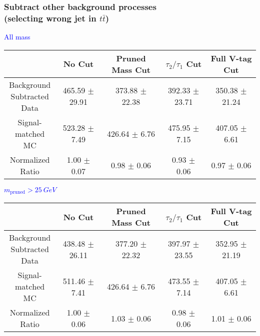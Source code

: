 \documentclass{beamer}
\begin{document}
\begin{frame}
  \frametitle{Subtract other background processes \\ (selecting wrong jet in $t\bar{t}$)}
  \begin{adjustwidth}{-1.5em}{-1.5em}
    \centering
    \vspace{6pt}
    \textcolor{blue}{All mass}
    \vspace{6pt}

    {\scriptsize
      \begin{tabular}{c | c | c | c | c}
        \hline
        & No Cut & Pruned Mass Cut & $\tau_2/\tau_1$ Cut & Full V-tag Cut \\
        \hline
        \makecell{Background \\ Subtracted \\ Data} & 465.59 $\pm$ 29.91 & 373.88 $\pm$ 22.38 & 392.33 $\pm$ 23.71 & 350.38 $\pm$ 21.24 \\
        \makecell{Signal-\\ matched MC} & 523.28 $\pm$ 7.49 & 426.64 $\pm$ 6.76 & 475.95 $\pm$ 7.15 & 407.05 $\pm$ 6.61 \\
        \hline
        \makecell{Normalized \\ Ratio} & 1.00 $\pm$ 0.07 & 0.98 $\pm$ 0.06 & 0.93 $\pm$ 0.06 & 0.97 $\pm$ 0.06 \\
        \hline
      \end{tabular}
    }

    \vspace{6pt}
    \textcolor{blue}{$m_\text{pruned} > \SI{25}{GeV}$}
    \vspace{6pt}

    {\scriptsize
      \begin{tabular}{c | c | c | c | c}
        \hline
        & No Cut & Pruned Mass Cut & $\tau_2/\tau_1$ Cut & Full V-tag Cut \\
        \hline
        \makecell{Background \\ Subtracted \\ Data} & 438.48 $\pm$ 26.11 & 377.20 $\pm$ 22.32 & 397.97 $\pm$ 23.55 & 352.95 $\pm$ 21.19 \\
        \makecell{Signal-\\ matched MC} & 511.46 $\pm$ 7.41 & 426.64 $\pm$ 6.76 & 473.55 $\pm$ 7.14 & 407.05 $\pm$ 6.61 \\
        \hline
        \makecell{Normalized \\ Ratio} & 1.00 $\pm$ 0.06 & 1.03 $\pm$ 0.06 & 0.98 $\pm$ 0.06 & 1.01 $\pm$ 0.06 \\
        \hline
      \end{tabular}
    }
  \end{adjustwidth}
\end{frame}
\end{document}
